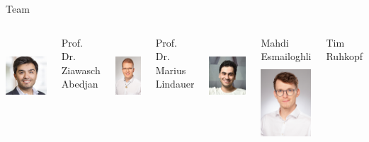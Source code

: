 \documentclass[aspectratio=169]{../latex_main/tntbeamer}  %
\begin{document}
\begin{frame}[c]{Team}

\begin{columns}[T]



\centering
\includegraphics[height=8em]{./figures/zia}

Prof. Dr.\\ Ziawasch Abedjan

\centering
\includegraphics[height=8em]{./figures/Lindauer_Marius_004small.jpg}

Prof. Dr.\\ Marius Lindauer

\centering
\includegraphics[height=8em]{./figures/mahdi}

Mahdi Esmailoghli\\

\centering
\includegraphics[height=8em]{./figures/tim}

Tim Ruhkopf\\

\end{columns}

\end{frame}
\end{document}
